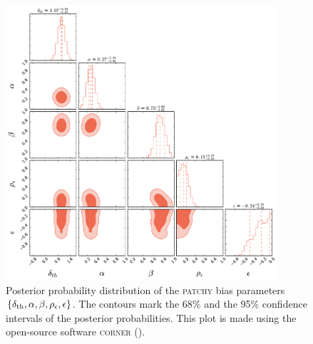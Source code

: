 \begin{figure}
\includegraphics[width=0.9\textwidth]{figures/mocks/posterior.pdf}
\caption{\label{fig:bias2} Posterior probability distribution of the \textsc{patchy} bias parameters $\{\delta_{\rm th},\alpha,\beta,\rho_{\epsilon},\epsilon\}$. The contours mark the 68$\%$ and the 95$\%$ confidence intervals of the posterior probabilities. This plot is made using the open-source software \textsc{corner} (\citealt{corner}).}
\end{figure}

